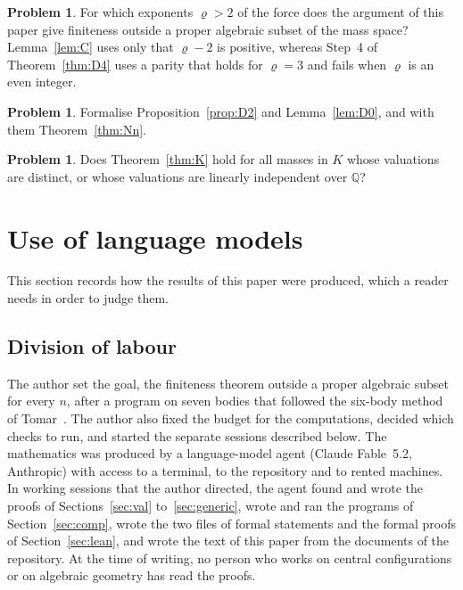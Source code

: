 \documentclass[11pt]{amsart}
\theoremstyle{definition}
\newtheorem{problem}[theorem]{Problem}
\theoremstyle{remark}
\numberwithin{equation}{section}
\newcommand{\QQ}{\mathbb{Q}}
\begin{document}
\begin{problem}
For which exponents $\varrho > 2$ of the force does the argument of this paper give finiteness outside
a proper algebraic subset of the mass space? Lemma~\ref{lem:C} uses only that $\varrho - 2$ is positive,
whereas Step~4 of Theorem~\ref{thm:D4} uses a parity that holds for $\varrho = 3$ and fails when
$\varrho$ is an even integer.
\end{problem}

\begin{problem}
Formalise Proposition~\ref{prop:D2} and Lemma~\ref{lem:D0}, and with them Theorem~\ref{thm:Nn}.
\end{problem}

\begin{problem}
Does Theorem~\ref{thm:K} hold for all masses in $K$ whose valuations are distinct, or whose valuations
are linearly independent over $\QQ$?
\end{problem}

\section{Use of language models}\label{sec:llm}

This section records how the results of this paper were produced, which a reader needs in order to
judge them.

\subsection*{Division of labour} The author set the goal, the finiteness theorem outside a proper
algebraic subset for every $n$, after a program on seven bodies that followed the six-body method of
Tomar~\cite{tomar6}. The author also fixed the budget for the computations, decided which checks to
run, and started the separate sessions described below. The mathematics was produced by a
language-model agent (Claude Fable~5.2, Anthropic) with access to a terminal, to the repository and to
rented machines. In working sessions that the author directed, the agent found and wrote the proofs of
Sections~\ref{sec:val} to~\ref{sec:generic}, wrote and ran the programs of Section~\ref{sec:comp},
wrote the two files of formal statements and the formal proofs of Section~\ref{sec:lean}, and wrote the
text of this paper from the documents of the repository. At the time of writing, no person who works
on central configurations or on algebraic geometry has read the proofs.
\end{document}
